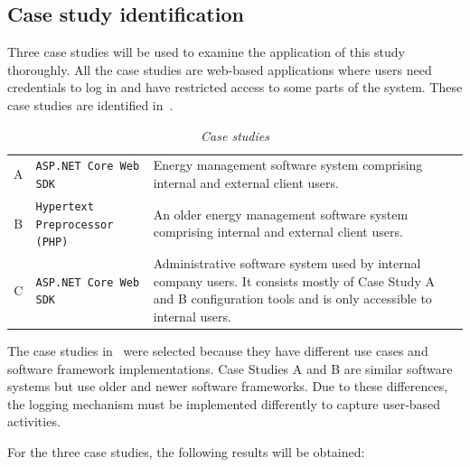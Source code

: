 \subsection{Case study identification}
Three case studies will be used to examine the application of this study thoroughly. All the case studies are web-based applications where users need credentials to log in and have restricted access to some parts of the system. These case studies are identified in~.

\begin{table}[!htb]
	\centering
	\caption[Case studies]
	{\textit{Case studies}}
	\label{tbl:ch3_caseStudies}
	\begin{tabularx}{\textwidth}{clX}
		\toprule
		\thead{Case study} & \thead{Software framework} & \thead{Description} \\
		\midrule
		\rowcolor{lightgray}
		A & \texttt{ASP.NET Core Web SDK} & \RaggedRight Energy management software system comprising internal and external client users. \\
		B & \texttt{Hypertext Preprocessor (PHP)} & \RaggedRight An older energy management software system comprising internal and external client users. \\
		\rowcolor{lightgray}
		C & \texttt{ASP.NET Core Web SDK} & \RaggedRight Administrative software system used by internal company users. It consists mostly of Case Study A and B configuration tools and is only accessible to internal users. \\
		\bottomrule
	\end{tabularx}
\end{table}

The case studies in~ were selected because they have different use cases and software framework implementations. Case Studies A and B are similar software systems but use older and newer software frameworks. Due to these differences, the logging mechanism must be implemented differently to capture user-based activities. \par For the three case studies, the following results will be obtained:

